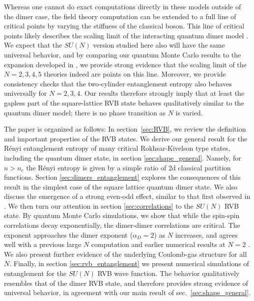 \documentclass[11pt]{iopart}
\begin{document}
Whereas one cannot do exact computations directly in these models outside of the dimer case, the field theory computation can be extended to a full line of critical points by varying the stiffness of the classical boson. This line of critical points likely describes the scaling limit of the interacting quantum dimer model \cite{Alet_dimers1,Alet_dimers2,Damle}.  We expect that the $SU(N)$ version studied here also will have the same universal behavior, and by comparing our quantum Monte Carlo results to the expansion developed in \cite{Damle}, we provide strong evidence that the scaling limit of the $N=2,3,4,5$ theories indeed are points on this line. Moreover, we provide consistency checks that the two-cylinder entanglement entropy also behaves universally for $N=2,3,4$. Our results therefore strongly imply that at least the gapless part of the square-lattice RVB state behaves qualitatively similar to the quantum dimer model; there is no phase transition as $N$ is varied.


The paper is organized as follows:
In section\ \ref{sec:RVB}, we review the definition and important properties of the RVB states. We derive our general result for the R\'enyi entanglement entropy of many critical Rokhsar-Kivelson type states, including the quantum dimer state, in section \ref{sec:shape_general}. Namely, for $n>n_c$ the R\'enyi entropy is given by a simple ratio of 2d classical partition functions.   Section \ref{sec:dimers_entanglement} explores the consequences of this result in the simplest case of the square lattice quantum dimer state. We also discuss the emergence of a strong even-odd effect, similar to that first observed in \cite{Ju2012}. We then turn our attention in section \ref{sec:correlations} to the $SU(N)$ RVB state.  By quantum Monte Carlo simulations, we show that while the spin-spin correlations decay exponentially, the dimer-dimer correlations are critical. The exponent approaches the dimer exponent ($\alpha_D=2$) as $N$ increases, and agrees well with a previous large $N$ computation \cite{Damle} and 
earlier numerical results at 
$N=2$ \cite{RVB1,RVB2}. We also present further evidence of the underlying Coulomb-gas structure for all $N$.
Finally, in section \ref{sec:rvb_entanglement} we present numerical simulations of entanglement for the $SU(N)$ RVB wave function. The behavior qualitatively resembles that of the dimer RVB state, and therefore provides strong evidence of universal behavior, in agreement with our main result of sec.~\ref{sec:shape_general}. 
\end{document}
